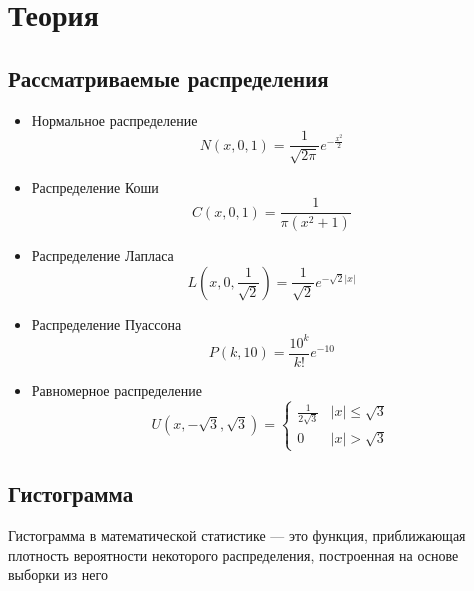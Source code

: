\documentclass[a4paper, 14pt]{extreport}
\begin{document}
\chapter{Теория}

\section{Рассматриваемые распределения}

\begin{itemize}
    \item Нормальное распределение 
	\begin{equation} \label{eq:Normal}
		N(x, 0, 1)=\frac{1}{\sqrt{2\pi}}e^{-\frac{x^2}{2}}
	\end{equation}
	
	\item Распределение Коши
	\begin{equation} \label{eq:Cauchy}
		C(x, 0, 1)=\frac{1}{\pi(x^2+1)}
	\end{equation}
	
	\item Распределение Лапласа
	\begin{equation} \label{eq:Laplace}
		L(x, 0, \frac{1}{\sqrt{2}})=\frac{1}{\sqrt{2}}e^{-\sqrt{2}|x|}
	\end{equation}
	
	\item Распределение Пуассона
	\begin{equation} \label{eq:Poisson}
		P(k, 10)=\frac{10^k}{k!}e^{-10}
	\end{equation} 
	
	\item Равномерное распределение
	\begin{equation} \label{eq:Uniform}
		U(x, -\sqrt{3}, \sqrt{3}) =
		\begin{cases}
			\frac{1}{2\sqrt{3}} & |x| \leq \sqrt{3} \\
			0 & |x|>\sqrt{3}
		\end{cases}
	\end{equation}	
\end{itemize}

\section{Гистограмма}

Гистограмма в математической статистике — это функция, приближающая плотность вероятности некоторого распределения, построенная на основе выборки из него \cite{Histogram}
\end{document}
